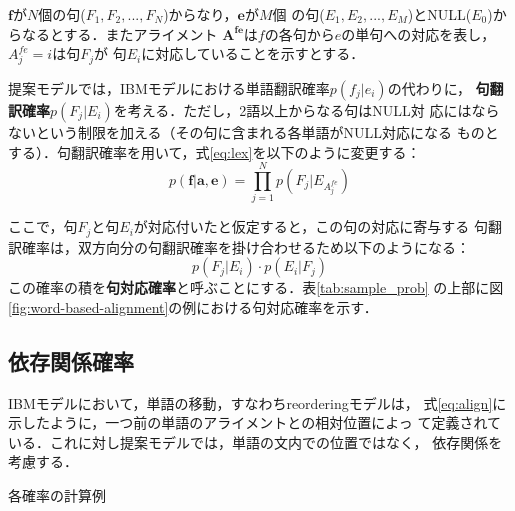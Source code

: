 \documentclass[japanese]{jnlp_1.4}
\begin{document}
$\mathbf{f}$が$N$個の句($F_1,F_2,...,F_N$)からなり，$\mathbf{e}$が$M$個
の句($E_1,E_2,...,E_M$)とNULL($E_0$)からなるとする．またアライメント
$\mathbf{A^{fe}}$は$f$の各句から$e$の単句への対応を表し，$A_j^{fe} = i$は句$F_j$が
句$E_i$に対応していることを示すとする．


提案モデルでは，IBMモデルにおける単語翻訳確率$p(f_j|e_i)$の代わりに，
{\bf 句翻訳確率}$p(F_j|E_i)$を考える．ただし，2語以上からなる句はNULL対
応にはならないという制限を加える（その句に含まれる各単語がNULL対応になる
ものとする）．句翻訳確率を用いて，式\ref{eq:lex}を以下のように変更する：
\begin{equation}
 \label{eq:lex_mod}
 p(\mathbf{f}|\mathbf{a},\mathbf{e}) = \prod_{j=1}^{N} p(F_j|E_{A_j^{fe}})
\end{equation}


ここで，句$F_j$と句$E_i$が対応付いたと仮定すると，この句の対応に寄与する
句翻訳確率は，双方向分の句翻訳確率を掛け合わせるため以下のようになる：
\begin{equation}
 \label{eq:phrase_alignment_prob}
p(F_j|E_i) \cdot p(E_i|F_j)
\end{equation}
この確率の積を{\bf 句対応確率}と呼ぶことにする．表\ref{tab:sample_prob} 
の上部に図\ref{fig:word-based-alignment}の例における句対応確率を示す．




\subsection{依存関係確率}

IBMモデルにおいて，単語の移動，すなわちreorderingモデルは，
\pagebreak
式\ref{eq:align}に示したように，一つ前の単語のアライメントとの相対位置によっ
て定義されている．これに対し提案モデルでは，単語の文内での位置ではなく，
依存関係を考慮する．

\begin{table}[t]
  \caption{各確率の計算例}
  \label{tab:sample_prob}

\end{table}
\end{document}
